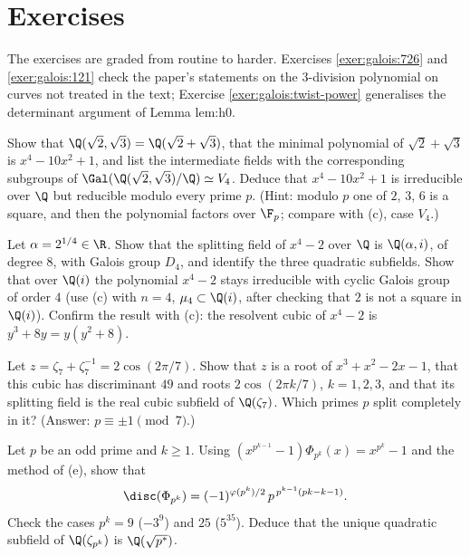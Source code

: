 \section{Exercises}\label{sec:galois:exercises}

The exercises are graded from routine to harder. Exercises \ref{exer:galois:726} and \ref{exer:galois:121} check the paper's statements on the $3$-division
polynomial on curves not treated in the text; Exercise \ref{exer:galois:twist-power} generalises the determinant argument of Lemma lem:h0.

\begin{exercise}\label{exer:galois:biquadratic}
Show that $\Q(\sqrt2,\sqrt3)=\Q(\sqrt2+\sqrt3)$, that the minimal polynomial of $\sqrt2+\sqrt3$ is $x^4-10x^2+1$, and list the intermediate fields with the
corresponding subgroups of $\Gal(\Q(\sqrt2,\sqrt3)/\Q)\simeq V_4$. Deduce that $x^4-10x^2+1$ is irreducible over $\Q$ but reducible modulo every prime $p$. (Hint: modulo $p$
one of $2$, $3$, $6$ is a square, and then the polynomial factors over $\F_p$; compare with (c), case $V_4$.)
\end{exercise}

\begin{exercise}\label{exer:galois:x4minus2}
Let $\alpha=2^{1/4}\in\R$. Show that the splitting field of $x^4-2$ over $\Q$ is $\Q(\alpha,i)$, of degree $8$, with Galois group $D_4$, and identify the three quadratic
subfields. Show that over $\Q(i)$ the polynomial $x^4-2$ stays irreducible with cyclic Galois group of order $4$ (use (c) with $n=4$,
$\mu_4\subset\Q(i)$, after checking that $2$ is not a square in $\Q(i)$). Confirm the result with (c): the resolvent cubic of $x^4-2$ is
$y^3+8y=y(y^2+8)$.
\end{exercise}

\begin{exercise}\label{exer:galois:cubic7}
Let $z=\zeta_7+\zeta_7^{-1}=2\cos(2\pi/7)$. Show that $z$ is a root of $x^3+x^2-2x-1$, that this cubic has discriminant $49$ and roots $2\cos(2\pi k/7)$, $k=1,2,3$, and that
its splitting field is the real cubic subfield of $\Q(\zeta_7)$. Which primes $p$ split completely in it? (Answer: $p\equiv\pm1\pmod7$.)
\end{exercise}

\begin{exercise}\label{exer:galois:disc-prime-power}
Let $p$ be an odd prime and $k\ge1$. Using $(x^{p^{k-1}}-1)\Phi_{p^k}(x)=x^{p^k}-1$ and the method of (e), show that
\[
\disc(\Phi_{p^k})=(-1)^{\varphi(p^k)/2}\,p^{\,p^{k-1}(pk-k-1)}.
\]
Check the cases $p^k=9$ ($-3^9$) and $25$ ($5^{35}$). Deduce that the unique quadratic subfield of $\Q(\zeta_{p^k})$ is $\Q(\sqrt{p^*})$.
\end{exercise}

